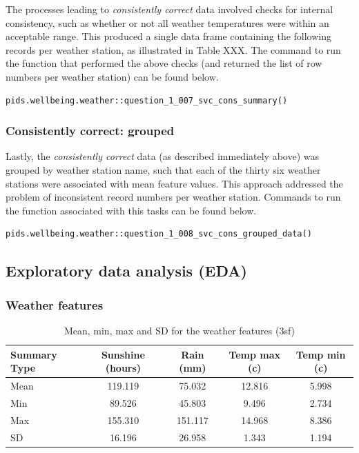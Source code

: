 \documentclass[12pt, oneside, openany]{book}
\begin{document}
The processes leading to \emph{consistently correct} data involved checks for internal consistency, such as whether or not all weather temperatures were within an acceptable range. This produced a single data frame containing the following records per weather station, as illustrated in Table XXX. The command to run the function that performed the above checks (and returned the list of row numbers per weather station) can be found below. 

\bigskip
\begin{lstlisting}
pids.wellbeing.weather::question_1_007_svc_cons_summary()
\end{lstlisting}


\subsubsection*{Consistently correct: grouped}

Lastly, the \emph{consistently correct} data (as described immediately above) was grouped by weather station name, such that each of the thirty six weather stations were associated with mean feature values. This approach addressed the problem of inconsistent record numbers per weather station. Commands to run the function associated with this tasks can be found below.

\bigskip
\begin{lstlisting}
pids.wellbeing.weather::question_1_008_svc_cons_grouped_data()
\end{lstlisting}

\subsection*{Exploratory data analysis (EDA)}

\subsubsection*{Weather features}

\begin{table}[h!]
	\centering
	\begin{tabular}{ |l|c|c|c|c| }
		\hline
		Summary Type & Sunshine (hours) & Rain (mm) & Temp max (c) & Temp min (c)\\
		\hline
		\hline
		Mean & 119.119  & 75.032  & 12.816 & 5.998 \\
		Min & 89.526  & 45.803  & 9.496   & 2.734 \\
		Max & 155.310 & 151.117  & 14.968  & 8.386 \\
		SD & 16.196  & 26.958   & 1.343  & 1.194 \\
		\hline
	\end{tabular}
	\caption{Mean, min, max and SD for the weather features (3sf)}
	\label{table:question_1_008_grouped_data_summary_non_scaled}
\end{table}
\end{document}
